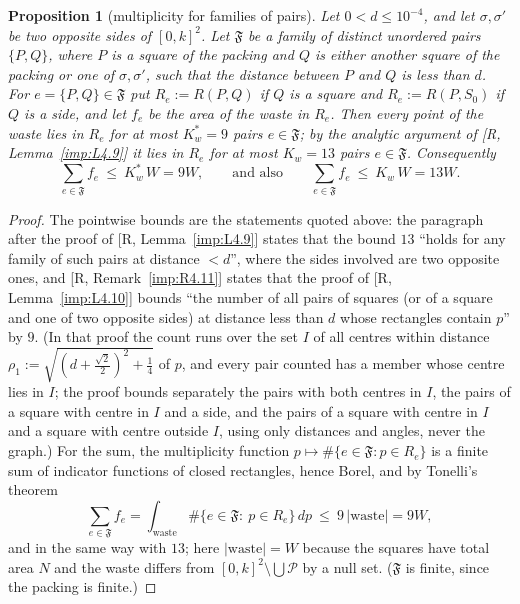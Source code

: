\documentclass[11pt]{amsart}
\newtheorem{proposition}[theorem]{Proposition}
\theoremstyle{definition}
\theoremstyle{remark}
\numberwithin{equation}{section}
\begin{document}
\begin{proposition}[multiplicity for families of pairs]\label{imp:pairs}
Let $0<d\le10^{-4}$, and let $\sigma,\sigma'$ be two opposite sides of $[0,k]^2$. Let $\mathfrak F$ be a family of
distinct unordered pairs $\{P,Q\}$, where $P$ is a square of the packing and $Q$ is either another square of the
packing or one of $\sigma,\sigma'$, such that the distance between $P$ and $Q$ is less than $d$. For
$e=\{P,Q\}\in\mathfrak F$ put $R_e:=R(P,Q)$ if $Q$ is a square and $R_e:=R(P,S_0)$ if $Q$ is a side, and let $f_e$
be the area of the waste in $R_e$. Then every point of the waste lies in $R_e$ for at most $K_w^*=9$ pairs
$e\in\mathfrak F$; by the analytic argument of [R, Lemma~\ref{imp:L4.9}] it lies in $R_e$ for at most $K_w=13$ pairs
$e\in\mathfrak F$. Consequently
\[
\sum_{e\in\mathfrak F}f_e\ \le\ K_w^*\,W=9W,\qquad\text{and also}\qquad \sum_{e\in\mathfrak F}f_e\ \le\ K_w\,W=13W .
\]
\end{proposition}

\begin{proof}
The pointwise bounds are the statements quoted above: the paragraph after the proof of [R, Lemma~\ref{imp:L4.9}]
states that the bound $13$ ``holds for any family of such pairs at distance $<d$'', where the sides involved are two
opposite ones, and [R, Remark~\ref{imp:R4.11}] states that the proof of [R, Lemma~\ref{imp:L4.10}] bounds ``the number
of all pairs of squares (or of a square and one of two opposite sides) at distance less than $d$ whose rectangles contain
$p$'' by $9$. (In that proof the count runs over the set $I$ of all centres within distance
$\rho_1:=\sqrt{(d+\frac{\sqrt2}2)^2+\frac14}$ of $p$, and every pair counted has a member whose centre lies in $I$; the
proof bounds separately the pairs with both centres in $I$, the pairs of a square with centre in $I$ and a side, and
the pairs of a square with centre in $I$ and a square with centre outside $I$, using only distances and angles, never
the graph.)
For the sum, the multiplicity function $p\mapsto\#\{e\in\mathfrak F:p\in R_e\}$ is a finite sum of indicator functions
of closed rectangles, hence Borel, and by Tonelli's theorem
\[
\sum_{e\in\mathfrak F}f_e=\int_{\text{waste}}\#\{e\in\mathfrak F:\ p\in R_e\}\,dp\ \le\ 9\,|\text{waste}|=9W,
\]
and in the same way with $13$; here $|\text{waste}|=W$ because the squares have total area $N$ and the waste differs from
$[0,k]^2\setminus\bigcup\mathcal P$ by a null set. ($\mathfrak F$ is finite, since the packing is finite.)
\end{proof}
\end{document}
